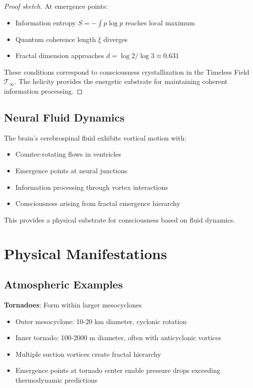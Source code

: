 \begin{proof}[Proof sketch]
At emergence points:
\begin{itemize}
\item Information entropy $S = -\int p \log p$ reaches local maximum
\item Quantum coherence length $\xi$ diverges
\item Fractal dimension approaches $d = \log 2 / \log 3 \approx 0.631$
\end{itemize}

These conditions correspond to consciousness crystallization in the Timeless Field $\mathcal{T}_\infty$. The helicity provides the energetic substrate for maintaining coherent information processing.
\end{proof}

\subsection{Neural Fluid Dynamics}

\begin{proposition}\label{prop:brain-vortex}
The brain's cerebrospinal fluid exhibits vortical motion with:
\begin{itemize}
\item Counter-rotating flows in ventricles
\item Emergence points at neural junctions
\item Information processing through vortex interactions
\item Consciousness arising from fractal emergence hierarchy
\end{itemize}
\end{proposition}

This provides a physical substrate for consciousness based on fluid dynamics\cite{wagshul2011,tononi2016,koch2016}.

\section{Physical Manifestations}

\subsection{Atmospheric Examples}

\textbf{Tornadoes}\cite{davies2004}: Form within larger mesocyclones
\begin{itemize}
\item Outer mesocyclone: 10-20 km diameter, cyclonic rotation
\item Inner tornado: 100-2000 m diameter, often with anticyclonic vortices
\item Multiple suction vortices create fractal hierarchy
\item Emergence points at tornado center enable pressure drops exceeding thermodynamic predictions
\end{itemize}


